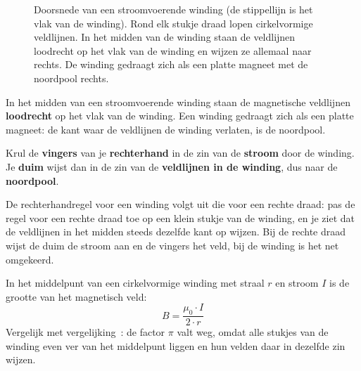 \documentclass{ximera}
\begin{document}
\begin{figure}[ht!]
\begin{center}
    \end{center}
    \caption{Doorsnede van een stroomvoerende winding (de stippellijn is het vlak van de winding). Rond elk stukje draad lopen cirkelvormige veldlijnen. In het midden van de winding staan de veldlijnen loodrecht op het vlak van de winding en wijzen ze allemaal naar rechts. De winding gedraagt zich als een platte magneet met de noordpool rechts.}
    \label{fig:veld_winding}
\end{figure}

\begin{proposition}[foldable=true,title={Veldlijnen bij een stroomvoerende winding}]\nl
    In het midden van een stroomvoerende winding staan de magnetische veldlijnen \textbf{loodrecht} op het vlak van de winding. Een winding gedraagt zich als een platte magneet: de kant waar de veldlijnen de winding verlaten, is de noordpool.
\end{proposition}

\begin{proposition}[foldable=true,title={Rechterhandregel voor een winding of een spoel}]\nl
    Krul de \textbf{vingers} van je \textbf{rechterhand} in de zin van de \textbf{stroom} door de winding. Je \textbf{duim} wijst dan in de zin van de \textbf{veldlijnen in de winding}, dus naar de \textbf{noordpool}.
\end{proposition}

\begin{remark}[expandable=true,title={Twee keer dezelfde regel}]\nl
    De rechterhandregel voor een winding volgt uit die voor een rechte draad: pas de regel voor een rechte draad toe op een klein stukje van de winding, en je ziet dat de veldlijnen in het midden steeds dezelfde kant op wijzen. Bij de rechte draad wijst de duim de stroom aan en de vingers het veld, bij de winding is het net omgekeerd.
\end{remark}

\begin{remark}[expandable=true,title={Extra: het veld in het middelpunt van een winding}]\nl
    In het middelpunt van een cirkelvormige winding met straal $r$ en stroom $I$ is de grootte van het magnetisch veld:
    \begin{equation*}
        B = \frac{\mu_0 \cdot I}{2 \cdot r}
    \end{equation*}
    Vergelijk met vergelijking~: de factor $\pi$ valt weg, omdat alle stukjes van de winding even ver van het middelpunt liggen en hun velden daar in dezelfde zin wijzen.
\end{remark}
\end{document}
